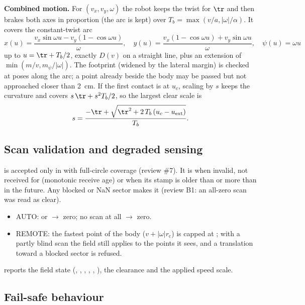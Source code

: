 \textbf{Combined motion.} For $(v_x, v_y, \omega)$ the robot keeps the twist for $\tr$ and then
brakes both axes in proportion (the arc is kept) over $T_b = \max(v/a, |\omega|/\alpha)$. It covers
the constant-twist arc
\begin{equation}
  x(u) = \frac{v_x\sin\omega u - v_y(1 - \cos\omega u)}{\omega}, \quad
  y(u) = \frac{v_x(1 - \cos\omega u) + v_y\sin\omega u}{\omega}, \quad \psi(u) = \omega u
\end{equation}
up to $u = \tr + T_b/2$, exactly $D(v)$ on a straight line, plus an extension of
$\min(m/v, m_\psi/|\omega|)$. The footprint (widened by the lateral margin) is checked at poses
along the arc; a point already beside the body may be passed but not approached closer than
2~cm. If the first contact is at $u_c$, scaling by $s$ keeps the curvature and covers
$s\,\tr + s^2 T_b/2$, so the largest clear scale is
\begin{equation}
  s = \frac{-\tr + \sqrt{\tr^2 + 2\,T_b\,(u_c - u_{\mathrm{ext}})}}{T_b}.
\end{equation}

\subsection{Scan validation and degraded sensing}

 is accepted only in  with full-circle
coverage (review \#7). It is  when invalid, not received for
 (monotonic receive age) or when its stamp is older than
 or more than  in the future.
Any blocked or NaN sector makes it  (review B1: an all-zero scan was read as clear).
\begin{itemize}
  \item AUTO:  or  $\to$ zero; no scan at all $\to$ zero.
  \item REMOTE: the fastest point of the body ($v + |\omega| r_{\mathrm{c}}$) is capped at
    ; with a partly blind scan the field still applies to the
    points it sees, and a translation toward a blocked sector is refused.
\end{itemize}
 reports the field state (, , ,
, , ), the clearance and the applied speed scale.

\subsection{Fail-safe behaviour}

